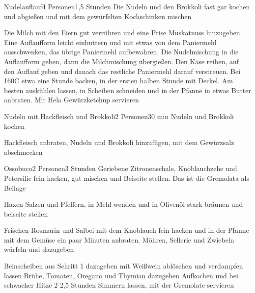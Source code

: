 \begin{recipe}{Nudelauflauf}{4 Personen}{1,5 Stunden}
Die Nudeln und den Brokkoli fast gar kochen und abgießen und mit dem gewürfelten Kochschinken mischen

\ing[Optional]{}{}
Die Milch mit den Eiern gut verrühren und eine Prise Muskatnuss hinzugeben.
Eine Auflaufform leicht einbuttern und mit etwas von dem Paniermehl ausschwenken, das übrige Paniermehl aufbewahren.
Die Nudelmischung in die Auflaufform geben, dann die Milchmischung übergießen. Den Käse reiben, auf den Auflauf geben und danach das restliche Paniermehl darauf verstreuen.
Bei 160\0C etwa eine Stunde backen, in der ersten halben Stunde mit Deckel.
Am besten auskühlen lassen, in Scheiben schneiden und in der Pfanne in etwas Butter anbraten.
Mit Hela Gewürzketchup servieren
\end{recipe}


\begin{recipe}{Nudeln mit Hackfleisch und Brokkoli}{2 Personen}{30 min}
Nudeln und Brokkoli kochen

Hackfleisch anbraten, Nudeln und Brokkoli hinzufügen, mit dem Gewürzsalz abschmecken
\end{recipe}


\begin{recipe}{Ossobuco}{2 Personen}{3 Stunden}
Geriebene Zitronenschale, Knoblauchzehe und Petersilie fein hacken, gut mischen und Beiseite stellen. Das ist die Gremolata als Beilage

Haxen Salzen und Pfeffern, in Mehl wenden und in Olivenöl stark bräunen und beiseite stellen

Frischen Rosmarin und Salbei mit dem Knoblauch fein hacken und in der Pfanne mit dem Gemüse ein paar Minuten anbraten.
Möhren, Sellerie und Zwiebeln würfeln und dazugeben

Beinscheiben aus Schritt 1 dazugeben mit Weißwein ablöschen und verdampfen lassen
Brühe, Tomaten, Oregano und Thymian dazugeben
Aufkochen und bei schwacher Hitze 2-2,5 Stunden Simmern  lassen, mit der Gremolate servieren
\end{recipe}

